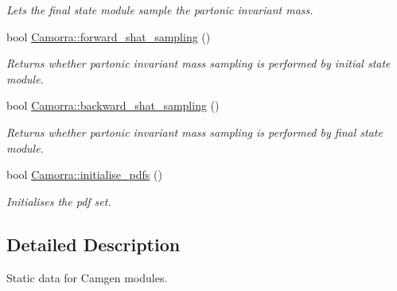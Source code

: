 \begin{DoxyCompactItemize}
\begin{DoxyCompactList}\small\item\em Lets the final state module sample the partonic invariant mass. \end{DoxyCompactList}\item 
bool \hyperlink{a00829_abce729e6c39e63ce207ee06da8be6498}{Camorra::forward\_\-shat\_\-sampling} ()
\begin{DoxyCompactList}\small\item\em Returns whether partonic invariant mass sampling is performed by initial state module. \end{DoxyCompactList}\item 
bool \hyperlink{a00829_afaf1ceb8d83f39ae2599190e77311ddd}{Camorra::backward\_\-shat\_\-sampling} ()
\begin{DoxyCompactList}\small\item\em Returns whether partonic invariant mass sampling is performed by final state module. \end{DoxyCompactList}\item 
bool \hyperlink{a00829_a10faaa355725620453fd5aa6cf7e2832}{Camorra::initialise\_\-pdfs} ()
\begin{DoxyCompactList}\small\item\em Initialises the pdf set. \end{DoxyCompactList}\end{DoxyCompactItemize}


\subsection{Detailed Description}
Static data for Camgen modules. 